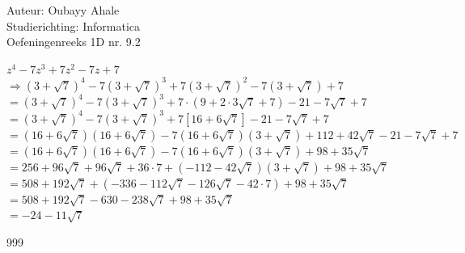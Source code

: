 \documentclass[a4paper]{article}
\begin{document}
  
\noindent \large Auteur: Oubayy Ahale          \\
\noindent \large Studierichting: Informatica   \\
\noindent \large Oefeningenreeks 1D nr. 9.2   \\

\medskip

\normalsize

$ z^4 - 7z^3 + 7z^2 - 7z + 7 $\\

$ \Rightarrow (3 + \sqrt{7})^4 - 7(3 + \sqrt{7})^3 + 7(3 + \sqrt{7})^2 - 7(3 + \sqrt{7}) + 7 $\\

$ = (3 + \sqrt{7})^4 - 7(3 + \sqrt{7})^3 + 7 \cdot (9 + 2 \cdot 3 \sqrt{7} + 7) - 21 - 7 \sqrt{7} + 7 $\\

$ = (3 + \sqrt{7})^4 - 7(3 + \sqrt{7})^3 + 7[16 + 6\sqrt{7}] - 21 - 7 \sqrt{7} + 7 $\\

$ = (16 + 6\sqrt{7})(16 + 6\sqrt{7}) - 7(16 + 6\sqrt{7})(3 + \sqrt{7}) + 112 + 42\sqrt{7} - 21 - 7\sqrt{7} + 7 $\\

$ = (16 + 6\sqrt{7})(16 + 6\sqrt{7}) - 7(16 + 6\sqrt{7})(3 + \sqrt{7}) + 98 + 35\sqrt{7} $\\

$ = 256 + 96\sqrt{7} + 96\sqrt{7} + 36 \cdot 7 + (-112 - 42\sqrt{7})(3 + \sqrt{7}) + 98 + 35\sqrt{7} $\\

$ = 508 + 192\sqrt{7} + (-336 - 112\sqrt{7} - 126\sqrt{7} - 42 \cdot 7) + 98 + 35\sqrt{7} $\\

$ = 508 + 192\sqrt{7} - 630 - 238\sqrt{7} + 98 + 35\sqrt{7} $\\

$ = -24 - 11\sqrt{7} $\\

\begin{thebibliography}{999}
\end{thebibliography}
\end{document}
